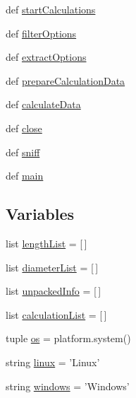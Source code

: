 \begin{DoxyCompactItemize}
\item 
def \hyperlink{namespacesniffer-txt_a48b4b2e8eaec0dd5d241c185b72c8b25}{start\-Calculations}
\item 
def \hyperlink{namespacesniffer-txt_a754a77b8d2212971bf2212b2a68d09a7}{filter\-Options}
\item 
def \hyperlink{namespacesniffer-txt_ab055d964bd7b072f723e37f8640ede67}{extract\-Options}
\item 
def \hyperlink{namespacesniffer-txt_ab5ee7a0f51c57d0a61d81f19150500b4}{prepare\-Calculation\-Data}
\item 
def \hyperlink{namespacesniffer-txt_ab0710996df2779d7bd89d74f012fbf3e}{calculate\-Data}
\item 
def \hyperlink{namespacesniffer-txt_a319a12cf872c33386afaa841104b95a5}{close}
\item 
def \hyperlink{namespacesniffer-txt_abde57596973903c0f1d1d1eb4ae3702f}{sniff}
\item 
def \hyperlink{namespacesniffer-txt_af1d54736a91422620b1d875de09e1e40}{main}
\end{DoxyCompactItemize}
\subsection*{Variables}
\begin{DoxyCompactItemize}
\item 
list \hyperlink{namespacesniffer-txt_af2801b4a4b86144b8120299fce8780e2}{length\-List} = \mbox{[}$\,$\mbox{]}
\item 
list \hyperlink{namespacesniffer-txt_ae65c5aad5af62d9d9a2a1c5a58ec3a9a}{diameter\-List} = \mbox{[}$\,$\mbox{]}
\item 
list \hyperlink{namespacesniffer-txt_a84149e7306f19b4944485099936a239f}{unpacked\-Info} = \mbox{[}$\,$\mbox{]}
\item 
list \hyperlink{namespacesniffer-txt_ab67272f005323340d63822df02ccd4ee}{calculation\-List} = \mbox{[}$\,$\mbox{]}
\item 
tuple \hyperlink{namespacesniffer-txt_a5db6a4e5a19872fc540ccb12df84454b}{os} = platform.\-system()
\item 
string \hyperlink{namespacesniffer-txt_acbec0cd98fae6d51a9a78d453d6ba6ca}{linux} = 'Linux'
\item 
string \hyperlink{namespacesniffer-txt_a82b6fe97a9763e8f2fc014cd51e5aaee}{windows} = 'Windows'
\end{DoxyCompactItemize}



